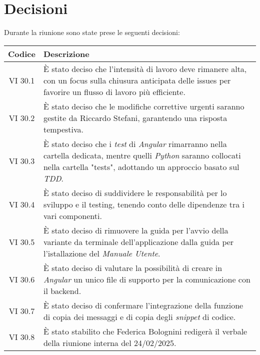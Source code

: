
\section{Decisioni}

Durante la riunione sono state prese le seguenti decisioni:

\vspace{0.5cm}

\begin{table}[htbp]
    \centering
    \begin{tabular}{|c|p{}|}
        \hline
        \rowcolor[gray]{0.75}
        \textbf{Codice} & \textbf{Descrizione}\\
        \hline
        VI 30.1 & È stato deciso che l’intensità di lavoro deve rimanere alta, con un focus sulla chiusura anticipata delle issues per favorire un flusso di lavoro più efficiente.\\
        \hline
        VI 30.2 & È stato deciso che le modifiche correttive urgenti saranno gestite da Riccardo Stefani, garantendo una risposta tempestiva. \\
        \hline
        VI 30.3 & È stato deciso che i \emph{test} di \emph{Angular} rimarranno nella cartella dedicata, mentre quelli \emph{Python} saranno collocati nella cartella "tests", adottando un approccio basato sul \emph{TDD}. \\ 
        \hline
        VI 30.4 & È stato deciso di suddividere le responsabilità per lo sviluppo e il testing, tenendo conto delle dipendenze tra i vari componenti. \\ 
        \hline
        VI 30.5 & È stato deciso di rimuovere la guida per l'avvio della variante da terminale dell'applicazione dalla guida per l'istallazione del \emph{Manuale Utente}. \\ 
        \hline
        VI 30.6 & È stato deciso di valutare la possibilità di creare in \emph{Angular} un unico file di supporto per la comunicazione con il backend. \\ 
        \hline
        VI 30.7 & È stato deciso di confermare l’integrazione della funzione di copia dei messaggi e di copia degli \emph{snippet} di codice. \\        
        \hline
        VI 30.8 & È stato stabilito che Federica Bolognini redigerà il verbale della riunione interna del 24/02/2025. \\      
        \hline
    \end{tabular}
\end{table}